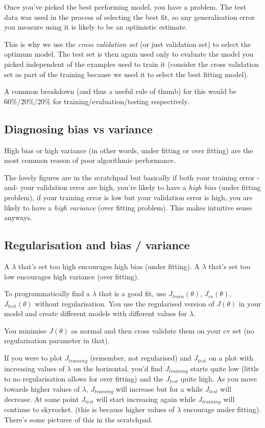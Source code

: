 Once you've picked the best performing model, you have a problem. The test data was used in the process of selecting the best fit, so any generalisation error you measure using it is likely to be an optimistic estimate.

This is why we use the \emph{cross validation set} (or just validation set) to select the optimum model. The test set is then again used only to evaluate the model you picked independent of the examples used to train it (consider the cross validation set as part of the training because we used it to select the best fitting model).

A common breakdown (and thus a useful rule of thumb) for this would be 60\%/20\%/20\% for training/evaluation/testing respectively.

\subsection{Diagnosing bias vs variance}

High bias or high variance (in other words, under fitting or over fitting) are the most common reason of poor algorithmic performance.

The lovely figures are in the scratchpad but basically if both your training error -and- your validation error are high, you're likely to have a \emph{high bias} (under fitting problem), if your training error is low but your validation error is high, you are likely to have a \emph{high variance} (over fitting problem). This makes intuitive sense anyways.

\subsection{Regularisation and bias / variance}

A $\lambda$ that's set too high encourages high bias (under fitting). A $\lambda$ that's set too low encourages high variance (over fitting).

To programmatically find a $\lambda$ that is a good fit, use $J_{train}(\theta)$, $J_{cv}(\theta)$, $J_{test}(\theta)$ without regularisation. You use the regularised version of $J(\theta)$ in your model and create different models with different values for $\lambda$.

You minimise $J(\theta)$ as normal and then cross validate them on your cv set (no regularisation parameter in that).

If you were to plot $J_{training}$ (remember, not regularised) and $J_{test}$ on a plot with increasing values of $\lambda$ on the horizontal, you'd find $J_{training}$ starts quite low (little to no regularisation allows for over fitting) and the $J_{test}$ quite high. As you move towards higher values of $\lambda$, $J_{training}$ will increase but for a while $J_{test}$ will decrease. At some point $J_{test}$ will start increasing again while $J_{training}$ will continue to skyrocket. (this is because higher values of $\lambda$ encourage under fitting). There's some pictures of this in the scratchpad.

